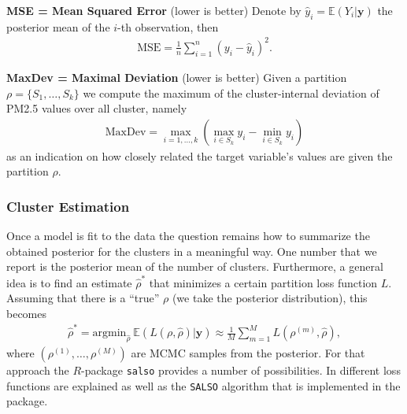 \documentclass[12pt,a4paper]{article}
\begin{document}
\textbf{MSE = Mean Squared Error} (lower is better)
Denote by $\hat{y}_i = \mathbb{E}(Y_i | \mathbf{y})$ the posterior mean of the $i$-th observation, then
\begin{align*}
    \text{MSE} = \frac{1}{n} \sum_{i=1}^n (y_i - \hat{y}_i)^2.
\end{align*}

\textbf{MaxDev = Maximal Deviation} (lower is better)
Given a partition $\rho
= \{S_1, \ldots, S_k\}$ we compute the maximum of the cluster-internal 
deviation of PM2.5 values over all cluster, namely
\begin{align*}
    \text{MaxDev} = \max_{i=1, \ldots, k} \left(\max_{i\in S_k} y_i - 
    \min_{i\in S_k} y_i
     \right)
\end{align*}
as an indication on how closely related the target variable's
values are given the partition $\rho$.


% 

\subsubsection{Cluster Estimation}
Once a model is fit to the data the question remains how to summarize the obtained posterior for the clusters in a meaningful way. One number that we report is the posterior mean of the number of clusters. Furthermore, a general idea is to find an estimate $\hat{\rho}^*$ that minimizes a certain partition loss function $L$. Assuming that there is a \enquote{true} $\rho$ (we take the posterior distribution), this becomes
\begin{align*}
    \hat{\rho}^* = \text{argmin}_{\hat{\rho}} \ \mathbb{E} ( L(\rho, \hat{\rho}) | \mathbf{y} ) \approx \frac{1}{M} \sum_{m=1}^M L (\rho^{(m)} , \hat{\rho} ),
\end{align*}
where $\left( \rho^{(1)}, \dots , \rho^{(M)} \right)$ are MCMC samples from the posterior. For that approach the $R$-package \texttt{salso} \cite{salso} provides a number of possibilities. In \cite{Dahl2022-salso} different loss functions are explained as well as the \texttt{SALSO} algorithm that is implemented in the package.
\end{document}

